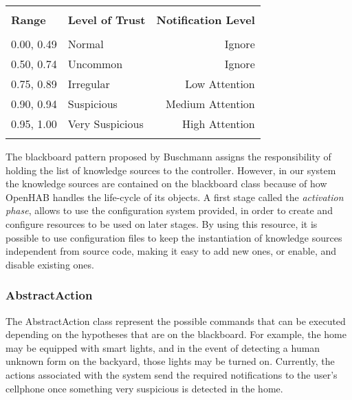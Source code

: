 
{\centering
{\footnotesize
	 \label{tab:anomalyscore} 
	\begin{tabular}{llr}
		\hline
		&  \\
		\textbf{Range}    & 
		\textbf{Level of Trust}  & \textbf{Notification Level} \\ 
		\hline
				&  \\
    0.00, 0.49 & Normal& Ignore \\ 
    0.50, 0.74 & Uncommon &  Ignore\\
	0.75, 0.89  & Irregular&  Low Attention\\
	0.90, 0.94 & Suspicious&  Medium Attention  \\
	0.95, 1.00  & Very Suspicious& High Attention \\
	\hline
	&  \\
	\end{tabular}
}\par
}

The blackboard pattern proposed by Buschmann \etAl \cite{Buschmann:1996:PSA:249013} assigns the responsibility of holding the list of knowledge sources to the controller. However, in our system the knowledge sources are contained on the blackboard class because of how OpenHAB handles the life-cycle of its objects. A first stage called the \textit{activation phase}, allows to use the configuration system provided, in order to create and configure resources to be used on later stages. By using this resource, it is possible to use configuration files to keep the instantiation of knowledge sources independent from source code, making it easy to add new ones, or enable, and disable existing ones.\\


\subsubsection{AbstractAction}
The AbstractAction class represent the possible commands that can be executed depending on the hypotheses that are on the blackboard. For example, the home may be equipped with smart lights, and in the event of detecting a human unknown form on the backyard, those lights may be turned on. Currently, the actions associated with the system send the required notifications to the user's cellphone once something very suspicious is detected in the home. 


